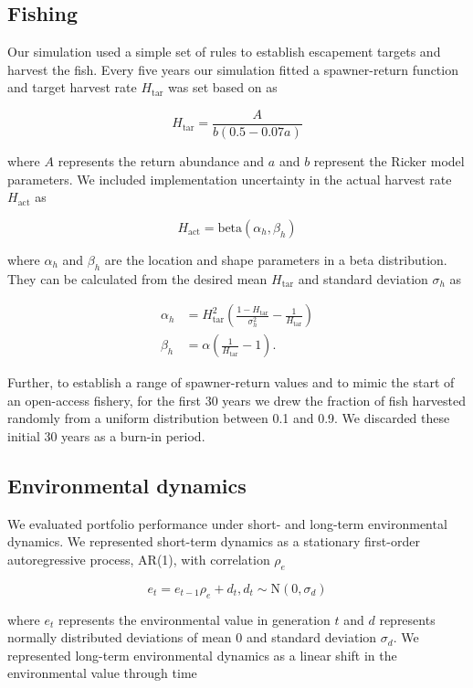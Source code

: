 \subsection{Fishing}

Our simulation used a simple set of rules to establish escapement targets and harvest the fish. Every five years our simulation fitted a spawner-return function and target harvest rate $H_{\mathrm{tar}}$ was set based on \citet{hilborn1992} as

\[H_{\mathrm{tar}} = \frac{A}{b (0.5 - 0.07a)}
  \label{eq:esc}\]

\noindent where $A$ represents the return abundance and $a$ and $b$ represent the Ricker model parameters. We included implementation uncertainty in the actual harvest rate $H_{\mathrm{act}}$ as

\[H_{\mathrm{act}} = \mathrm{beta}(\alpha_h, \beta_h)\]

\noindent where $\alpha_h$ and $\beta_h$ are the location and shape parameters in a beta distribution. They can be calculated from the desired mean $H_{\mathrm{tar}}$ and standard deviation $\sigma_h$ as \citep[p.~97]{morgan1990}

\[\begin{aligned}
  \alpha_h &= H_{\mathrm{tar}}^2
                \left(
                \frac{1 - H_{\mathrm{tar}}}{\sigma_h^2} - \frac{1}{H_{\mathrm{tar}}}
                \right)\\
   \beta_h &= \alpha \left({\frac{1}{H_{\mathrm{tar}}} - 1}\right).\end{aligned}\]

Further, to establish a range of spawner-return values and to mimic the start of an open-access fishery, for the first 30 years we drew the fraction of fish harvested randomly from a uniform distribution between 0.1 and 0.9. We discarded these initial 30 years as a burn-in period.

\subsection{Environmental dynamics}

We evaluated portfolio performance under short- and long-term environmental dynamics. We represented short-term dynamics as a stationary first-order autoregressive process, AR(1), with correlation $\rho_e$

\[e_t = e_{t-1} \rho_e + d_t, d_t \sim \mathrm{N}(0, \sigma_d)\]

\noindent where $e_t$ represents the environmental value in generation $t$ and $d$ represents normally distributed deviations of mean 0 and standard deviation $\sigma_d$. We represented long-term environmental dynamics as a linear shift in the environmental value through time

